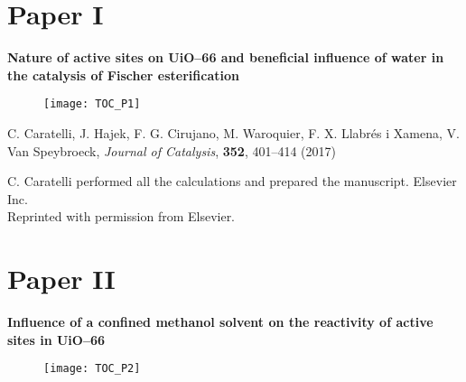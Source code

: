 \renewcommand\evenpagerightmark{{\scshape\small Published papers}}
\renewcommand\oddpageleftmark{{\scshape\small Chapter 5}}
\graphicspath{{figures/papers/}}



\clearpage

\section*{Paper I}

\vspace{0.1\textheight}
{
\large
\textbf{Nature of active sites on UiO--66 and beneficial influence of water in
the catalysis of Fischer esterification} }
\begin{figure}[h!]
	\centering
	\texttt{[image: TOC\_P1]}
\end{figure}
 
\noindent
C. Caratelli, J. Hajek, F. G. Cirujano, M. Waroquier, F. X. Llabr\'es i Xamena, V.
Van Speybroeck, \textit{Journal of Catalysis}, \textbf{352}, 401--414 (2017)
\npar

\vfill
\noindent C. Caratelli performed all the calculations and prepared the manuscript.
\npar
\noindent {} Elsevier Inc. \\
Reprinted with permission from Elsevier.

\clearpage{\pagestyle{empty}\cleardoublepage}
% 
\clearpage{\pagestyle{empty}\cleardoublepage}



\section*{Paper II}

\vspace{0.1\textheight}
{
\large
\textbf{Influence of a confined methanol solvent on the reactivity of active
sites in UiO--66} }
\begin{figure}[h!]
	\centering
	\texttt{[image: TOC\_P2]}
\end{figure}
 
